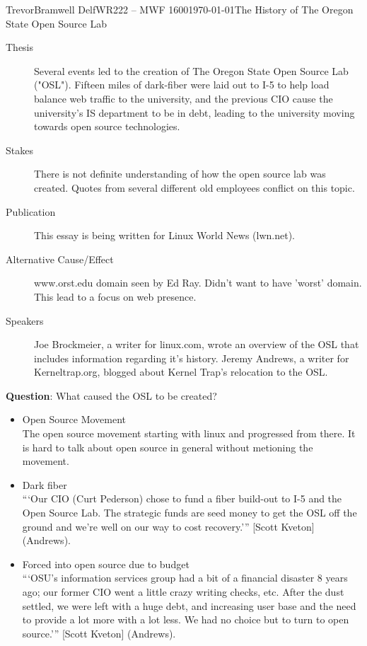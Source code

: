 \documentclass[12pt,letterpaper]{article}
\begin{document}
\begin{mla}{Trevor}{Bramwell}
{Delf}{WR222 -- MWF 1600}{\today}{The History of The Oregon
    State Open Source Lab}

\begin{description}
    \item[Thesis]
        Several events led to the creation of The Oregon State Open Source Lab 
("OSL"). Fifteen miles of dark-fiber were laid out to I-5 to help load balance
web traffic to the university, and the previous CIO cause the university's IS
department to be in debt, leading to the university moving towards open source
technologies.
    \item[Stakes]
        There is not definite understanding of how the open source lab was
created. Quotes from several different old employees conflict on this topic.
    \item[Publication]
        This essay is being written for Linux World News (lwn.net).
    \item[Alternative Cause/Effect]
        www.orst.edu domain seen by Ed Ray. Didn't want to have 'worst' domain.
This lead to a focus on web presence.
    \item[Speakers]
        Joe Brockmeier, a writer for linux.com, wrote an overview of the OSL
that includes information regarding it's history.
        Jeremy Andrews, a writer for Kerneltrap.org, blogged about Kernel
Trap's relocation to the OSL.
\end{description}
\pagebreak
                        
\noindent\textbf{Question}: What caused the OSL to be created?
\begin{itemize}
    \item Open Source Movement \\
        The open source movement starting with linux and progressed from there.
        It is hard to talk about open source in general without metioning the
        movement.

    \item Dark fiber \\
        ```Our CIO (Curt Pederson) chose to fund a fiber build-out to I-5 and the Open
        Source Lab. The strategic funds are seed money to get the OSL off the ground
        and we're well on our way to cost recovery.''' [Scott Kveton] (Andrews).

    \item Forced into open source due to budget \\
        ```OSU's information services group had a bit of a financial disaster 8 years
        ago; our former CIO went a little crazy writing checks, etc. After the dust
        settled, we were left with a huge debt, and increasing user base and the need
        to provide a lot more with a lot less. We had no choice but to turn to open
        source.''' [Scott Kveton] (Andrews).


\end{itemize}
\end{mla}
\end{document}
